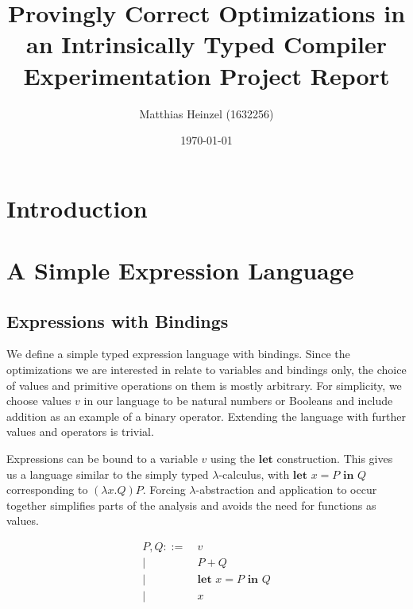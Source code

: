 \documentclass[11pt,a4paper]{article}
\title{Provingly Correct Optimizations in an Intrinsically Typed Compiler\\
  \vspace{1cm}
  \large Experimentation Project Report}
\author{Matthias Heinzel (1632256)}
\date{\today}
\begin{document}
\maketitle
\tableofcontents


\section{Introduction}
\cite{norell2007agda}
\cite{augustsson1999intrinsic}

\section{A Simple Expression Language}

\subsection{Expressions with Bindings}

We define a simple typed expression language with bindings.
Since the optimizations we are interested in relate to variables and bindings only,
the choice of values and primitive operations on them is mostly arbitrary.
For simplicity, we choose values $v$ in our language to be natural numbers or Booleans
and include addition as an example of a binary operator.
Extending the language with further values and operators is trivial.

Expressions can be bound to a variable $v$ using the $\textbf{let}$ construction.
This gives us a language similar to the simply typed $\lambda$-calculus,
with $\textbf{let } x = P \textbf{ in } Q$ corresponding to $(\lambda x. Q) P$.
Forcing $\lambda$-abstraction and application to occur together
simplifies parts of the analysis and
avoids the need for functions as values.

\begin{align*}
  P, Q ::=&\ v
  \\ \big|&\ P + Q
  \\ \big|&\ \textbf{let } x = P \textbf{ in } Q
  \\ \big|&\ x
\end{align*}

\end{document}
